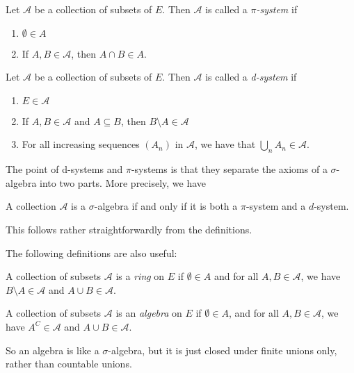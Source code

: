 \documentclass[a4paper]{article}
\begin{document}
\begin{defi}[$\pi$-system]
  Let $\mathcal{A}$ be a collection of subsets of $E$. Then $\mathcal{A}$ is called a \emph{$\pi$-system} if
  \begin{enumerate}
    \item $\emptyset \in A$
    \item If $A, B \in \mathcal{A}$, then $A \cap B \in A$.
  \end{enumerate}
\end{defi}

\begin{defi}[d-system]
  Let $\mathcal{A}$ be a collection of subsets of $E$. Then $\mathcal{A}$ is called a \emph{d-system} if
  \begin{enumerate}
    \item $E \in \mathcal{A}$
    \item If $A, B \in \mathcal{A}$ and $A \subseteq B$, then $B \setminus A \in \mathcal{A}$
    \item For all increasing sequences $(A_n)$ in $\mathcal{A}$, we have that $\bigcup_n A_n \in \mathcal{A}$.
  \end{enumerate}
\end{defi}
The point of d-systems and $\pi$-systems is that they separate the axioms of a $\sigma$-algebra into two parts. More precisely, we have
\begin{prop}
  A collection $\mathcal{A}$ is a $\sigma$-algebra if and only if it is both a $\pi$-system and a $d$-system.
\end{prop}
This follows rather straightforwardly from the definitions.

The following definitions are also useful:
\begin{defi}[Ring]
  A collection of subsets $\mathcal{A}$ is a \emph{ring} on $E$ if $\emptyset \in A$ and for all $A, B \in \mathcal{A}$, we have $B \setminus A \in \mathcal{A}$ and $A \cup B \in \mathcal{A}$.
\end{defi}

\begin{defi}[Algebra]
  A collection of subsets $\mathcal{A}$ is an \emph{algebra} on $E$ if $\emptyset \in A$, and for all $A, B \in \mathcal{A}$, we have $A^C \in \mathcal{A}$ and $A \cup B \in \mathcal{A}$.
\end{defi}
So an algebra is like a $\sigma$-algebra, but it is just closed under finite unions only, rather than countable unions.
\end{document}
